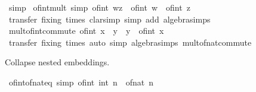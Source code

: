 \begin{isabellebody}
\ simp%
\endisatagproof
{\isafoldproof}%
%
\isadelimproof
\isanewline
%
\endisadelimproof
\isanewline
{}\isamarkupfalse%
\ of{\isacharunderscore}{\kern0pt}int{\isacharunderscore}{\kern0pt}mult\ {\isacharbrackleft}{\kern0pt}simp{\isacharbrackright}{\kern0pt}{\isacharcolon}{\kern0pt}\ {\isachardoublequoteopen}of{\isacharunderscore}{\kern0pt}int\ {\isacharparenleft}{\kern0pt}w{\isacharasterisk}{\kern0pt}z{\isacharparenright}{\kern0pt}\ {\isacharequal}{\kern0pt}\ of{\isacharunderscore}{\kern0pt}int\ w\ {\isacharasterisk}{\kern0pt}\ of{\isacharunderscore}{\kern0pt}int\ z{\isachardoublequoteclose}\isanewline
%
\isadelimproof
\ \ %
\endisadelimproof
%
\isatagproof
{}\isamarkupfalse%
\ {\isacharparenleft}{\kern0pt}transfer\ fixing{\isacharcolon}{\kern0pt}\ times{\isacharparenright}{\kern0pt}\ {\isacharparenleft}{\kern0pt}clarsimp\ simp\ add{\isacharcolon}{\kern0pt}\ algebra{\isacharunderscore}{\kern0pt}simps{\isacharparenright}{\kern0pt}%
\endisatagproof
{\isafoldproof}%
%
\isadelimproof
\isanewline
%
\endisadelimproof
\isanewline
{}\isamarkupfalse%
\ mult{\isacharunderscore}{\kern0pt}of{\isacharunderscore}{\kern0pt}int{\isacharunderscore}{\kern0pt}commute{\isacharcolon}{\kern0pt}\ {\isachardoublequoteopen}of{\isacharunderscore}{\kern0pt}int\ x\ {\isacharasterisk}{\kern0pt}\ y\ {\isacharequal}{\kern0pt}\ y\ {\isacharasterisk}{\kern0pt}\ of{\isacharunderscore}{\kern0pt}int\ x{\isachardoublequoteclose}\isanewline
%
\isadelimproof
\ \ %
\endisadelimproof
%
\isatagproof
{}\isamarkupfalse%
\ {\isacharparenleft}{\kern0pt}transfer\ fixing{\isacharcolon}{\kern0pt}\ times{\isacharparenright}{\kern0pt}\ {\isacharparenleft}{\kern0pt}auto\ simp{\isacharcolon}{\kern0pt}\ algebra{\isacharunderscore}{\kern0pt}simps\ mult{\isacharunderscore}{\kern0pt}of{\isacharunderscore}{\kern0pt}nat{\isacharunderscore}{\kern0pt}commute{\isacharparenright}{\kern0pt}%
\endisatagproof
{\isafoldproof}%
%
\isadelimproof
%
\endisadelimproof
%
\begin{isamarkuptext}%
Collapse nested embeddings.%
\end{isamarkuptext}\isamarkuptrue%
\isamarkupfalse%
\ of{\isacharunderscore}{\kern0pt}int{\isacharunderscore}{\kern0pt}of{\isacharunderscore}{\kern0pt}nat{\isacharunderscore}{\kern0pt}eq\ {\isacharbrackleft}{\kern0pt}simp{\isacharbrackright}{\kern0pt}{\isacharcolon}{\kern0pt}\ {\isachardoublequoteopen}of{\isacharunderscore}{\kern0pt}int\ {\isacharparenleft}{\kern0pt}int\ n{\isacharparenright}{\kern0pt}\ {\isacharequal}{\kern0pt}\ of{\isacharunderscore}{\kern0pt}nat\ n{\isachardoublequoteclose}\isanewline

\end{isabellebody}
